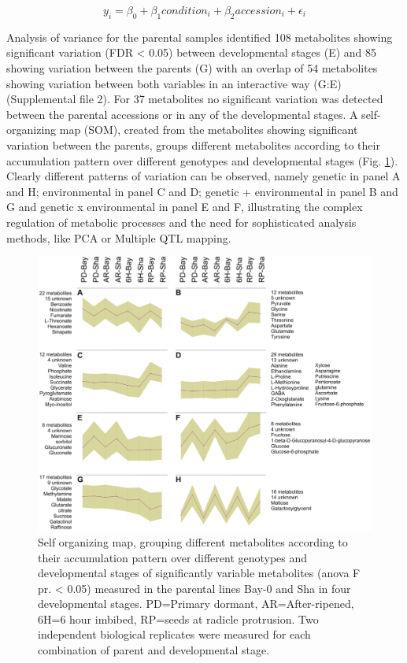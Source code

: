$$ y_{i}   =   \beta_{0} + \beta_{1}condition_{i} + \beta_{2}accession_{i} + \epsilon_{i} $$

Analysis of variance for the parental samples identified 108 metabolites showing significant variation (FDR < 0.05) between 
developmental stages (E) and 85 showing variation between the parents (G) with an overlap of 54 metabolites showing variation 
between both variables in an interactive way (G:E) (Supplemental file 2). For 37 metabolites no significant variation was 
detected between the parental accessions or in any of the developmental stages. A self-organizing map (SOM), created from the 
metabolites showing significant variation between the parents, groups different metabolites according to their accumulation 
pattern over different genotypes and developmental stages (Fig. \ref{fig:SOM}). Clearly different patterns of variation can be observed, 
namely genetic in panel A and H; environmental in panel C and D; genetic + environmental in panel B and G and genetic x 
environmental in panel E and F, illustrating the complex regulation of metabolic processes and the need for sophisticated 
analysis methods, like PCA or Multiple QTL mapping\cite{Arends:2010}. 

\begin{figure}[h!]
  \centering
  \includegraphics[keepaspectratio,scale=0.30]{eps/image_3_2_1.eps}
  \caption[Self organizing map]{Self organizing map, grouping different metabolites according to their accumulation pattern over different 
    genotypes and developmental stages of significantly variable metabolites (anova F pr. < 0.05)  measured in the parental lines Bay-0 
    and Sha in four developmental stages.  PD=Primary dormant, AR=After-ripened, 6H=6 hour imbibed, RP=seeds at radicle protrusion. Two
    independent biological replicates were measured for each combination of parent and developmental stage.}
    \label{fig:SOM}
\end{figure}

